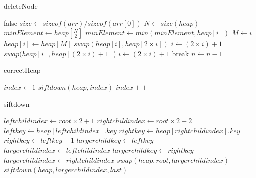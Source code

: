 \documentclass{article}
\begin{document}
\begin{algorithm}[H]
\caption{deleteNode}\label{alg:cap}
\begin{algorithmic}
\State \Return false
\Else
\State $size \gets sizeof(arr) / sizeof(arr[0])$
\State $N \gets size(heap)$
\State $minElement \gets heap[\frac{N}{2}]$
\State $minElement \gets min(minElement, heap[i])$
\EndFor
{}
\State $M \gets i$
\State $heap[i] \gets heap[M]$
\EndIf
\EndFor
{}
\State $swap(heap[i], heap[2 \times i])$
\State $i \gets (2 \times i)+1$
\State $swap(heap[i], heap[(2 \times i)+1]$)
\State $i \gets (2 \times i)+1$
\Else
\State break
\EndIf
\EndFor
\State $n \gets n-1$
\EndIf
\end{algorithmic}
\end{algorithm}

\begin{algorithm}[H]
\caption{correctHeap}\label{alg:cap}
\begin{algorithmic}
\State $index \gets 1$
\State $siftdown(heap, index)$
\State $index++$
\EndWhile
\end{algorithmic}
\end{algorithm}

\begin{algorithm}[H]
\caption{siftdown}\label{alg:cap}
\begin{algorithmic}
\State $leftchildindex \gets root \times 2+1$
\State $rightchildindex \gets root \times 2+2$
\State $leftkey \gets heap[leftchildindex].key$
\State $rightkey \gets heap[rightchildindex].key$
\Else
\State $rightkey \gets leftkey-1$
\EndIf
{}
\State $largerchildkey \gets leftkey$
\State $largerchildindex \gets leftchildindex$
\Else
\State $largerchildkey \gets rightkey$
\State $largerchildindex \gets rightchildindex$
\EndIf
{}
\State $swap(heap, root, largerchildindex)$
\State $siftdown(heap, largerchildindex, last)$
\EndIf
\EndIf
\end{algorithmic}
\end{algorithm}
\end{document}
